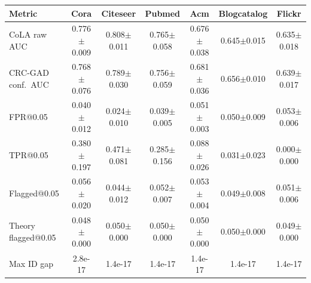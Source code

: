 \begin{tabular}{lcccccc}
\toprule
\textbf{Metric} & Cora & Citeseer & Pubmed & Acm & Blogcatalog & Flickr \\
\midrule
CoLA raw AUC & 0.776$\pm$0.009 & 0.808$\pm$0.011 & 0.765$\pm$0.058 & 0.676$\pm$0.038 & 0.645$\pm$0.015 & 0.635$\pm$0.018 \\
CRC-GAD conf.\ AUC & 0.768$\pm$0.076 & 0.789$\pm$0.030 & 0.756$\pm$0.059 & 0.681$\pm$0.036 & 0.656$\pm$0.010 & 0.639$\pm$0.017 \\
FPR@0.05 & 0.040$\pm$0.012 & 0.024$\pm$0.010 & 0.039$\pm$0.005 & 0.051$\pm$0.003 & 0.050$\pm$0.009 & 0.053$\pm$0.006 \\
TPR@0.05 & 0.380$\pm$0.197 & 0.471$\pm$0.081 & 0.285$\pm$0.156 & 0.088$\pm$0.026 & 0.031$\pm$0.023 & 0.000$\pm$0.000 \\
Flagged@0.05 & 0.056$\pm$0.020 & 0.044$\pm$0.012 & 0.052$\pm$0.007 & 0.053$\pm$0.004 & 0.049$\pm$0.008 & 0.051$\pm$0.006 \\
Theory flagged@0.05 & 0.048$\pm$0.000 & 0.050$\pm$0.000 & 0.050$\pm$0.000 & 0.050$\pm$0.000 & 0.050$\pm$0.000 & 0.049$\pm$0.000 \\
Max ID gap & 2.8e-17 & 1.4e-17 & 1.4e-17 & 1.4e-17 & 1.4e-17 & 1.4e-17 \\
\bottomrule
\end{tabular}
